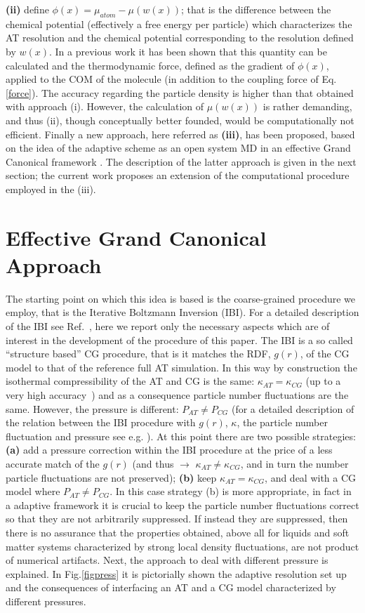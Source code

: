 \documentclass[aps,prb,preprint,citeautoscript]{revtex4}
\newcommand{\redc}[1]{{\color{red} #1}}
\begin{document}
{\bf (ii)} define $\phi(x)=\mu_{atom}-{\mu}{(w(x))}$; that is the difference between the chemical potential (effectively a free energy per particle) which characterizes the AT resolution and the chemical potential corresponding to the resolution defined by $w(x)$. In a previous work \cite{simon} it has been shown that this quantity can be calculated and the thermodynamic force, defined as the gradient of $\phi(x)$, applied to the COM of the molecule (in addition to the coupling force of Eq.\ref{force}). The accuracy regarding the particle density is higher than that obtained with approach (i). However, the calculation of $\mu(w(x))$ is rather demanding, and thus (ii), though conceptually better founded, would be computationally not efficient. Finally a new approach, here referred as {\bf (iii)}, has been proposed, based on the idea of the adaptive scheme as an open system MD in an effective Grand Canonical framework \cite{prlgc}. The description of the latter approach is given in the next section; the current work proposes an extension of the computational procedure employed in the (iii).

\section{Effective Grand Canonical Approach}
The starting point on which this idea is based is the coarse-grained procedure we employ, that is the Iterative Boltzmann Inversion  (IBI). 
For a detailed description of the IBI see Ref.~\cite{ibm}, here we report only the necessary aspects which are of interest in the development of the procedure of this paper.
The IBI is a so called ``structure based'' CG procedure, that is it matches the RDF, $g(r)$, of the CG model to that of the reference full AT simulation. In this way by construction the isothermal compressibility of the AT and CG is the same: $\kappa_{AT}=\kappa_{CG}$ \redc{(up to a very high accuracy}~\cite{han}) and as a consequence particle number fluctuations are the same. However, the pressure is different: $P_{AT}\neq P_{CG}$  (for a detailed description of the relation between the IBI procedure with $g(r)$, $\kappa$, the particle number fluctuation and pressure see e.g. \cite{han}). At this point there are two possible strategies: {\bf (a)}  add a pressure correction within the IBI procedure at the price of a less accurate match of the $g(r)$ (and thus $\rightarrow$ $\kappa_{AT}\neq\kappa_{CG}$, and in turn the number particle fluctuations are not preserved); {\bf (b)} keep $\kappa_{AT}=\kappa_{CG}$, and deal with a CG model where $P_{AT}\neq P_{CG}$. In this case strategy (b) is more appropriate, in fact in a adaptive framework it is crucial to keep the particle number fluctuations correct so that they are not arbitrarily suppressed. If instead they are suppressed, then there is no assurance that the properties obtained, above all for liquids and soft matter systems characterized by strong local density fluctuations, are not product of numerical artifacts. Next, the approach to deal with different pressure is explained. In Fig.\ref{figpress} it is pictorially shown the adaptive resolution set up and the consequences of interfacing an AT and a CG model characterized by different pressures. 
\end{document}
